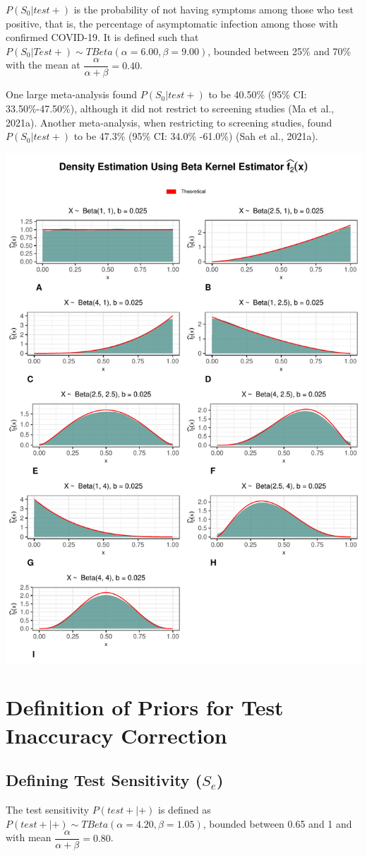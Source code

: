 \documentclass[12pt,twoside]{smiththesis}
\begin{document}
\(P(S_0|test +)\) is the probability of not having symptoms among those who test positive, that is, the percentage of asymptomatic infection among those with confirmed COVID-19. It is defined such that \(P(S_0|Test +) \sim TBeta(\alpha = 6.00, \beta = 9.00)\), bounded between 25\% and 70\% with the mean at \(\dfrac{\alpha}{\alpha + \beta} = 0.40\).

One large meta-analysis found \(P(S_0|test+)\) to be 40.50\% (95\% CI: 33.50\%-47.50\%), although it did not restrict to screening studies (Ma et al., 2021a). Another meta-analysis, when restricting to screening studies, found \(P(S_0|test+)\) to be 47.3\% (95\% CI: 34.0\% -61.0\%) (Sah et al., 2021a).

\includegraphics[width=0.5\linewidth]{thesis_files/figure-latex/unnamed-chunk-37-1}

\hypertarget{definition-of-priors-for-test-inaccuracy-correction}{%
\section{Definition of Priors for Test Inaccuracy Correction}\label{definition-of-priors-for-test-inaccuracy-correction}}

\hypertarget{defining-test-sensitivity-s_e}{%
\subsection{\texorpdfstring{Defining Test Sensitivity (\(S_e\))}{Defining Test Sensitivity (S\_e)}}\label{defining-test-sensitivity-s_e}}

The test sensitivity \(P(test + | +)\) is defined as \(P(test +|+ )\sim TBeta(\alpha = 4.20, \beta = 1.05)\), bounded between 0.65 and 1 and with mean \(\dfrac{\alpha}{\alpha + \beta} = 0.80\).
\end{document}
